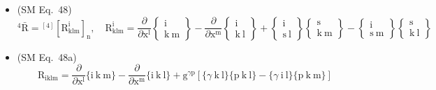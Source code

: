 \documentclass[12pt]{article}
\begin{document}
\begin{itemize}[label={},leftmargin=0pt]
    \item (SM Eq.\ 48) 
    \[
    {}^4\bar{\mathrm{R}} = {}^{[4]}\left[ \mathrm{R}^\mathrm{i}_{\mathrm{klm}} \right]_\mathrm{n}, \quad \mathrm{R}^\mathrm{i}_{\mathrm{klm}} = \frac{\partial}{\partial \mathrm{x^l}}\left\{ \begin{smallmatrix} \mathrm{i} \\ \mathrm{k\ m} \end{smallmatrix} \right\} - \frac{\partial}{\partial \mathrm{x^m}}\left\{ \begin{smallmatrix} \mathrm{i} \\ \mathrm{k\ l} \end{smallmatrix} \right\} + \left\{ \begin{smallmatrix} \mathrm{i} \\ \mathrm{s\ l} \end{smallmatrix} \right\}\left\{ \begin{smallmatrix} \mathrm{s} \\ \mathrm{k\ m} \end{smallmatrix} \right\} - \left\{ \begin{smallmatrix} \mathrm{i} \\ \mathrm{s\ m} \end{smallmatrix} \right\}\left\{ \begin{smallmatrix} \mathrm{s} \\ \mathrm{k\ l} \end{smallmatrix} \right\}
    \]

    \item (SM Eq.\ 48a) 
    \[
    \mathrm{R}_{\mathrm{iklm}} = \frac{\partial}{\partial \mathrm{x^l}}\{ \mathrm{i\ k\ m} \} - \frac{\partial}{\partial \mathrm{x^m}}\{ \mathrm{i\ k\ l} \} + \mathrm{g}^{\gamma\mathrm{p}} \left[ \{ \gamma\ \mathrm{k\ l} \}\{ \mathrm{p\ k\ l} \} - \{ \gamma\ \mathrm{i\ l} \}\{ \mathrm{p\ k\ m} \} \right]
    \]


\end{itemize}
\end{document}
